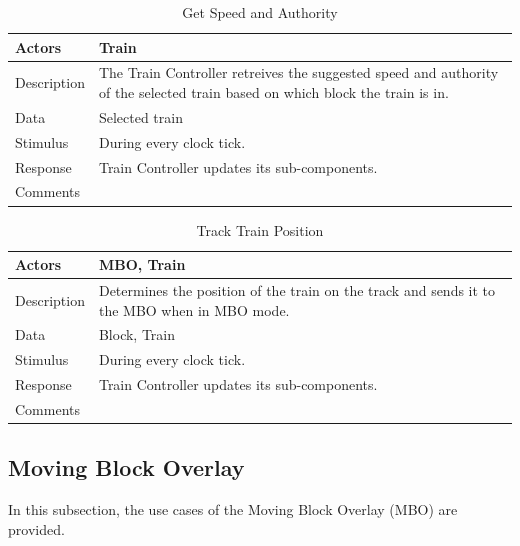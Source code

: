 \documentclass[]{article}
\begin{document}
      \begin{table}[H]
   	\centering
   	\caption{Get Speed and Authority}
   	\begin{tabular}{|l|l|}
   		\hline
   		Actors & \parbox[t]{10cm}{Train} \\ \hline
   		Description & \parbox[t]{10cm}{The Train Controller retreives the suggested speed and authority of the selected train based on which block the train is in.} \\ \hline
   		Data &  \parbox[t]{10cm}{Selected train } \\ \hline
   		Stimulus &  \parbox[t]{10cm}{During every clock tick.} \\ \hline
   		Response & \parbox[t]{10cm}{Train Controller updates its sub-components.  }\\ \hline
   		Comments & \parbox[t]{10cm}{}  \\ \hline
   	\end{tabular}
   \end{table}
   
     \begin{table}[H]
   	\centering
   	\caption{Track Train Position}
   	\begin{tabular}{|l|l|}
   		\hline
   		Actors & \parbox[t]{10cm}{MBO, Train} \\ \hline
   		Description & \parbox[t]{10cm}{Determines the position of the train on the track and sends it to the MBO when in MBO mode.} \\ \hline
   		Data &  \parbox[t]{10cm}{Block, Train} \\ \hline
   		Stimulus &  \parbox[t]{10cm}{During every clock tick.} \\ \hline
   		Response & \parbox[t]{10cm}{Train Controller updates its sub-components.  }\\ \hline
   		Comments & \parbox[t]{10cm}{}  \\ \hline
   	\end{tabular}
   \end{table}

\subsection{Moving Block Overlay}
In this subsection, the use cases of the Moving Block Overlay (MBO) are provided.
\end{document}
